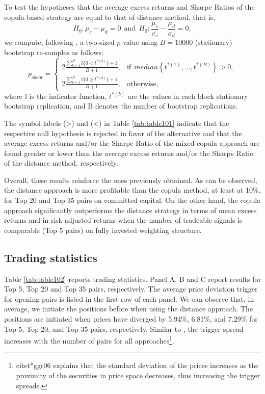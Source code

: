 \documentclass[a4paper,12pt]{report}
\begin{document}
	To test the hypotheses that the average excess returns and Sharpe Ratios of the copula-based strategy are equal to that of distance method, that is,
	\begin{equation}
	H_{0}:\mu_{c}-\mu_{d}=0  \ \ \textrm{and}
	\ \  H_{0}:\frac{\mu_{c}}{\sigma_{c}}-\frac{\mu_{d}}{\sigma_{d}}=0,
	\label{eq:eq153}
	\end{equation}
	we compute, following \citet*{davison1997}, a two-sized $p$-value using $B=10000$ (stationary) bootstrap re-samples as follows:
	\begin{equation}
	p_{sboot}=
	\begin{cases}
	2\frac{\sum_{b=1}^{B}\mathbb{I}\{0< t^{\ast(b)}\}+1}{B+1}, &\text{if} ~~median\left\{ t^{\ast \left( 1\right) },...,t^{\ast \left( B\right)}\right\} > 0, \\
	2\frac{\sum_{b=1}^{B}\mathbb{I}\{0\geq t^{\ast(b)}\}+1}{B+1}, &\text{otherwise},
	\end{cases}
	\label{eq:eq152}
	\end{equation}
	where $\mathbb{I}$ is the indicator function, $t^{\ast(b)}$ are the values in each block stationary bootstrap replication, and B denotes the number of bootstrap replications.
	
	The symbol labels (>) and (<) in Table \ref{tab:table101} indicate that the respective null hypothesis is rejected in favor of the alternative and that the average excess returns and/or the Sharpe Ratio of the mixed copula approach are found greater or lower than the average excess returns and/or the Sharpe Ratio of the distance method, respectively.
	
	Overall, these results reinforce the ones previously obtained. As can be observed, the distance approach is more profitable than the copula method, at least at 10\%, for Top 20 and Top 35 pairs on committed capital. On the other hand, the copula approach significantly outperforms the distance strategy in terms of mean excess returns and in risk-adjusted returns when the number of tradeable signals is comparable (Top 5 pairs) on fully invested weighting structure.

\vspace{1.0cm}
	
	\subsection{Trading statistics}
	
Table \ref{tab:table102} reports trading statistics. Panel A, B and C report results for Top 5, Top 20 and Top 35 pairs, respectively. The average price deviation trigger for opening pairs is listed in the first row of each panel. We can observe that, in average, we initiate the positions before when using the distance approach. The positions are initiated when prices have diverged by 5.94\%, 6.81\%, and 7.29\% for Top 5, Top 20, and Top 35 pairs, respectively. Similar to \citet*{ggr06}, the trigger spread increases with the number of pairs for all approaches\footnote{citet*{ggr06} explains that the standard deviation of the prices increases as the proximity of the securities in price space decreases, thus increasing the trigger spreads.}.
\end{document}
